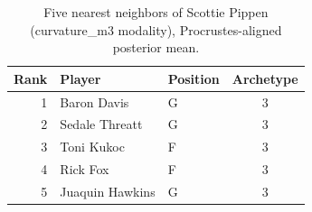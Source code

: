 \begin{table}[htbp]
  \centering\small
  \begin{tabular}{rllc}
    \toprule
    Rank & Player & Position & Archetype \\
    \midrule
    1 & Baron Davis & G & 3 \\
    2 & Sedale Threatt & G & 3 \\
    3 & Toni Kukoc & F & 3 \\
    4 & Rick Fox & F & 3 \\
    5 & Juaquin Hawkins & G & 3 \\
    \bottomrule
  \end{tabular}
  \caption{Five nearest neighbors of Scottie Pippen (curvature_m3 modality), Procrustes-aligned posterior mean.}
  \label{tab:Scottie_Pippen_neighbors_curvature_m3}
\end{table}


